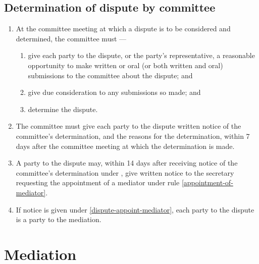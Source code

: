 \documentclass[../constitution.tex]{subfiles}
\begin{document}
\hypertarget{determination-of-dispute-by-committee}{%
\subsection{Determination of dispute by committee}\label{determination-of-dispute-by-committee}}

\begin{enumerate}

\item At the committee meeting at which a dispute is to be considered and determined, the committee must ---

  \begin{enumerate}
  
  \item give each party to the dispute, or the party's representative, a reasonable opportunity to make written or oral (or both written and oral) submissions to the committee about the dispute; and
  \item give due consideration to any submissions so made; and
  \item determine the dispute. \label{committee-determine-dispute}
  \end{enumerate}
\item The committee must give each party to the dispute written notice of the committee's determination, and the reasons for the determination, within 7 days after the committee meeting at which the determination is made.
\item A party to the dispute may, within 14 days after receiving notice of the committee's determination under  , give written notice to the secretary requesting the appointment of a mediator under rule \ref{appointment-of-mediator}. \label{dispute-appoint-mediator}
\item If notice is given under  \ref{dispute-appoint-mediator}, each party to the dispute is a party to the mediation.
\end{enumerate}

\hypertarget{division-4-mediation}{%
\section{Mediation}\label{division-4-mediation}}

\hypertarget{application-of-division-mediation}{%
\subsection{}\label{application-of-division-mediation}}
\end{document}
